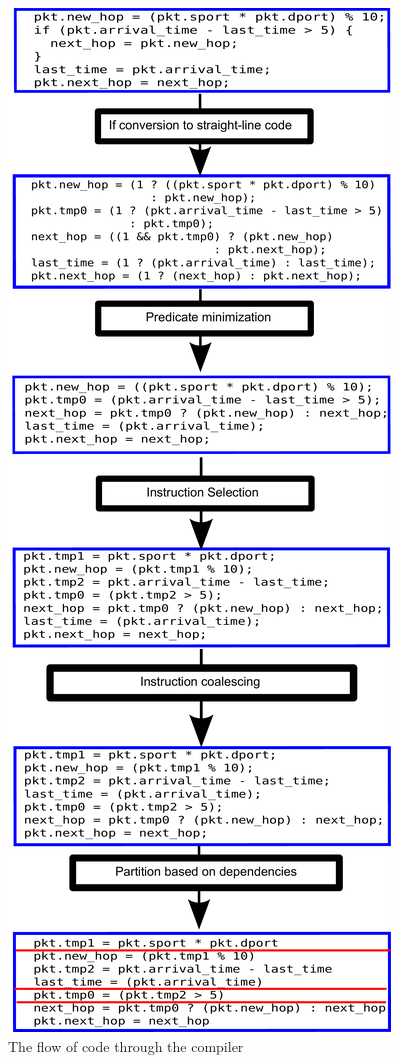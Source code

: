 \begin{figure}
\includegraphics[width=\columnwidth]{compiler_flow.pdf}
\caption{The flow of code through the compiler}
\label{fig:flow}
\end{figure}

